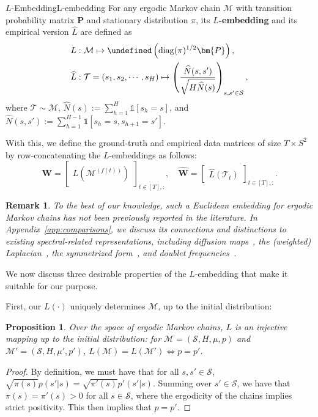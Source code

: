 \documentclass[twoside]{article}
\let\vec\undefined %
\DeclareMathOperator{\vec}{\text{\normalfont vec}}
\def\mP{{\bm{P}}}
\def\mW{{\bm{W}}}
\def\gM{{\mathcal{M}}}
\def\gS{{\mathcal{S}}}
\def\gT{{\mathcal{T}}}
\theoremstyle{plain}
\newtheorem{proposition}{Proposition}[section]
\newtheorem{remark}{Remark}
\newcommand{\diag}{\mathrm{diag}}
\newcommand{\indicator}{\mathds{1}}
\begin{document}
\begin{definition}{$L$-Embedding}{L-embedding}
\label{def:l-embedding}
    For any ergodic Markov chain $\gM$ with transition probability matrix $\mP$ and stationary distribution $\pi$, its \textbf{$L$-embedding} and its empirical version $\widehat{L}$ are defined as
    \begin{align*}
        &L : \gM \mapsto \vec\left(\diag(\pi)^{1/2} \mP\right), \\
        &\widehat{L} : \gT = (s_1, s_2, \cdots, s_H) \mapsto \left( \frac{\widehat{N}(s, s')}{\sqrt{H \widehat{N}(s)}} \right)_{s, s' \in \gS},
    \end{align*}
    where $\gT \sim \gM$, $\widehat{N}(s) := \sum_{h=1}^H \indicator[s_h = s]$, and $\widehat{N}(s, s') := \sum_{h=1}^{H-1} \indicator[s_h = s, s_{h+1} = s']$.
\end{definition}

With this, we define the ground-truth and empirical data matrices of size $T \times S^2$ by row-concatenating the $L$-embeddings as follows:
\begin{equation}
\label{eqn:W}
    \mW = \begin{bmatrix}
        L(\gM^{(f(t))})
    \end{bmatrix}_{t \in [T],:}, \quad
    \widehat{\mW} = \begin{bmatrix}
        \widehat{L}(\gT_t)
    \end{bmatrix}_{t \in [T],:}.
\end{equation}

\begin{remark}
    To the best of our knowledge, such a Euclidean embedding for ergodic Markov chains has not been previously reported in the literature.
    In Appendix~\ref{app:comparisons}, we discuss its connections and distinctions to existing spectral-related representations, including diffusion maps~\citep{coifman2006diffusion}, the (weighted) Laplacian~\citep{chung1997spectral}, the symmetrized form~\citep{markovmixing}, and doublet frequencies~\citep{wolfer2021markov,vidyasagar2014markov}.
\end{remark}

We now discuss three desirable properties of the $L$-embedding that make it suitable for our purpose.

First, our $L(\cdot)$ uniquely determines $\gM$, up to the initial distribution:

\begin{proposition}
\label{prop:L}
    Over the space of ergodic Markov chains, $L$ is an injective mapping up to the initial distribution: for $\gM = (\gS, H, \mu, p)$ and $\gM' = (\gS, H, \mu', p')$, $L(\gM) = L(\gM') \Longleftrightarrow p = p'$.
\end{proposition}
\begin{proof}
    By definition, we must have that for all $s, s' \in \gS$, $\sqrt{\pi(s)} p(s' | s) = \sqrt{\pi'(s)} p'(s' | s)$.
    Summing over $s' \in \gS$, we have that $\pi(s) = \pi'(s) > 0$ for all $s \in \gS$, where the ergodicity of the chains implies strict positivity.
    This then implies that $p = p'$.
\end{proof}
\end{document}
